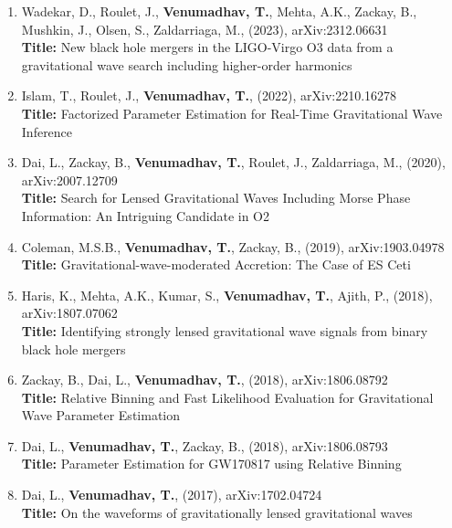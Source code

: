 \documentclass{article}
\begin{document}
{\begin{enumerate}[leftmargin=*,itemsep=0.45em,topsep=0.35em]
\item Wadekar, D., Roulet, J., \textbf{Venumadhav, T.}, Mehta, A.K., Zackay, B., Mushkin, J., Olsen, S., Zaldarriaga, M., (2023), arXiv:2312.06631 \\
\textbf{Title:} New black hole mergers in the LIGO-Virgo O3 data from a gravitational wave search including higher-order harmonics
\item Islam, T., Roulet, J., \textbf{Venumadhav, T.}, (2022), arXiv:2210.16278 \\
\textbf{Title:} Factorized Parameter Estimation for Real-Time Gravitational Wave Inference
\item Dai, L., Zackay, B., \textbf{Venumadhav, T.}, Roulet, J., Zaldarriaga, M., (2020), arXiv:2007.12709 \\
\textbf{Title:} Search for Lensed Gravitational Waves Including Morse Phase Information: An Intriguing Candidate in O2
\item Coleman, M.S.B., \textbf{Venumadhav, T.}, Zackay, B., (2019), arXiv:1903.04978 \\
\textbf{Title:} Gravitational-wave-moderated Accretion: The Case of ES Ceti
\item Haris, K., Mehta, A.K., Kumar, S., \textbf{Venumadhav, T.}, Ajith, P., (2018), arXiv:1807.07062 \\
\textbf{Title:} Identifying strongly lensed gravitational wave signals from binary black hole mergers
\item Zackay, B., Dai, L., \textbf{Venumadhav, T.}, (2018), arXiv:1806.08792 \\
\textbf{Title:} Relative Binning and Fast Likelihood Evaluation for Gravitational Wave Parameter Estimation
\item Dai, L., \textbf{Venumadhav, T.}, Zackay, B., (2018), arXiv:1806.08793 \\
\textbf{Title:} Parameter Estimation for GW170817 using Relative Binning
\item Dai, L., \textbf{Venumadhav, T.}, (2017), arXiv:1702.04724 \\
\textbf{Title:} On the waveforms of gravitationally lensed gravitational waves
\end{enumerate}
\par}

\noindent\underline{}
\\
\end{document}

